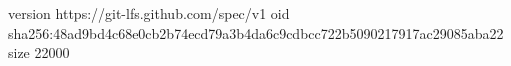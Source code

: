 version https://git-lfs.github.com/spec/v1
oid sha256:48ad9bd4c68e0cb2b74ecd79a3b4da6c9cdbcc722b5090217917ac29085aba22
size 22000
